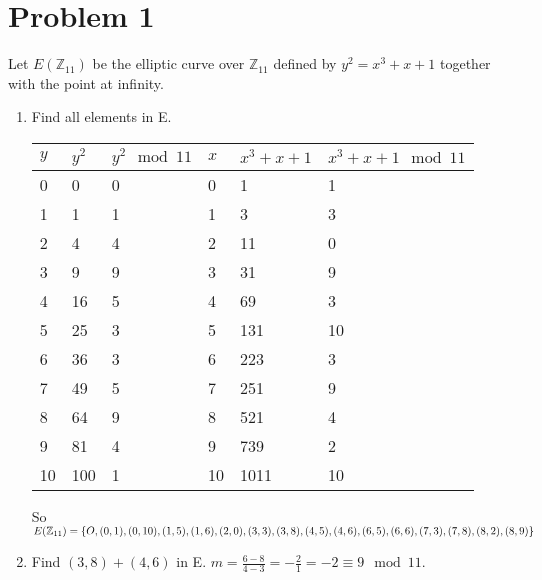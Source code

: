 \documentclass[12pt]{article}
\title{\scalebox{2}{Math 431 Homework 4}}
\author{\scalebox{1.5}{Theo Koss}}
\date{October 2020}
\newcommand{\Z}{\mathbb{Z}}
\begin{document}
\maketitle
\section{Problem 1}
Let $E(\Z_{11})$ be the elliptic curve over $\Z_{11}$ defined by $y^2=x^{3}+x+1$ together with the point at infinity.
\begin{enumerate}
    \item Find all elements in E.
    \newline \begin{table}[h]
\begin{tabular}{|l|l|l|l|l|l|}
\hline
$y$ & $y^2$ & $y^2\mod{11}$ & $x$ & $x^3+x+1$ & $x^3+x+1\mod{11}$ \\ \hline
0   & 0     & 0             & 0   & 1         & 1                 \\ \hline
1   & 1     & 1             & 1   & 3         & 3                 \\ \hline
2   & 4     & 4             & 2   & 11        & 0                 \\ \hline
3   & 9     & 9             & 3   & 31        & 9                 \\ \hline
4   & 16    & 5             & 4   & 69        & 3                 \\ \hline
5   & 25    & 3             & 5   & 131       & 10                \\ \hline
6   & 36    & 3             & 6   & 223       & 3                 \\ \hline
7   & 49    & 5             & 7   & 251       & 9                 \\ \hline
8   & 64    & 9             & 8   & 521       & 4                 \\ \hline
9   & 81    & 4             & 9   & 739       & 2                 \\ \hline
10  & 100   & 1             & 10  & 1011      & 10                \\ \hline
\end{tabular}
\end{table}
\newline So $E(\Z_{11})=\{O,(0,1),(0,10),(1,5),(1,6),(2,0),(3,3),(3,8),(4,5),(4,6),(6,5),\newline
(6,6),(7,3),(7,8),(8,2),(8,9)\}$
    \item Find $(3,8)+(4,6)$ in E.
    $m=\frac{6-8}{4-3}=-\frac{2}{1}=-2\equiv9\mod{11}$.

\end{enumerate}
\end{document}
